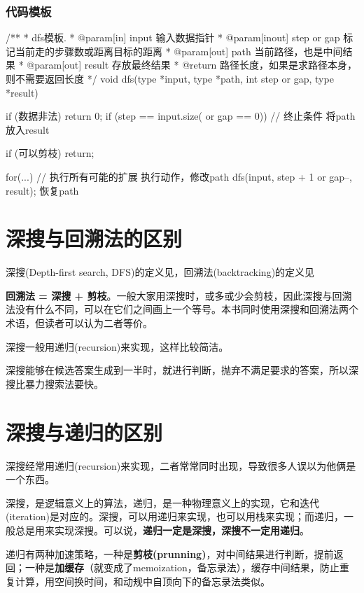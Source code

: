 \subsubsection{代码模板}
\begin{Codex}[label=dfs_template.c]
/**
 * dfs模板.
 * @param[in] input 输入数据指针
 * @param[inout] step or gap 标记当前走的步骤数或距离目标的距离
 * @param[out] path 当前路径，也是中间结果
 * @param[out] result 存放最终结果
 * @return 路径长度，如果是求路径本身，则不需要返回长度
 */
void dfs(type *input, type *path, int step or gap, type *result) {
    if (数据非法) return 0;
    if (step == input.size( or gap == 0)) { // 终止条件
        将path放入result
    }

    if (可以剪枝) return;

    for(...) { // 执行所有可能的扩展
        执行动作，修改path
        dfs(input, step + 1 or gap--, result);
        恢复path
    }
}
\end{Codex}


\section{深搜与回溯法的区别}
深搜(Depth-first search, DFS)的定义见，回溯法(backtracking)的定义见

\textbf{回溯法 = 深搜 + 剪枝}。一般大家用深搜时，或多或少会剪枝，因此深搜与回溯法没有什么不同，可以在它们之间画上一个等号。本书同时使用深搜和回溯法两个术语，但读者可以认为二者等价。

深搜一般用递归(recursion)来实现，这样比较简洁。

深搜能够在候选答案生成到一半时，就进行判断，抛弃不满足要求的答案，所以深搜比暴力搜索法要快。

\section{深搜与递归的区别}
深搜经常用递归(recursion)来实现，二者常常同时出现，导致很多人误以为他俩是一个东西。

深搜，是逻辑意义上的算法，递归，是一种物理意义上的实现，它和迭代(iteration)是对应的。深搜，可以用递归来实现，也可以用栈来实现；而递归，一般总是用来实现深搜。可以说，\textbf{递归一定是深搜，深搜不一定用递归}。

递归有两种加速策略，一种是\textbf{剪枝(prunning)}，对中间结果进行判断，提前返回；一种是\textbf{加缓存}（就变成了memoization，备忘录法），缓存中间结果，防止重复计算，用空间换时间，和动规中自顶向下的备忘录法类似。

